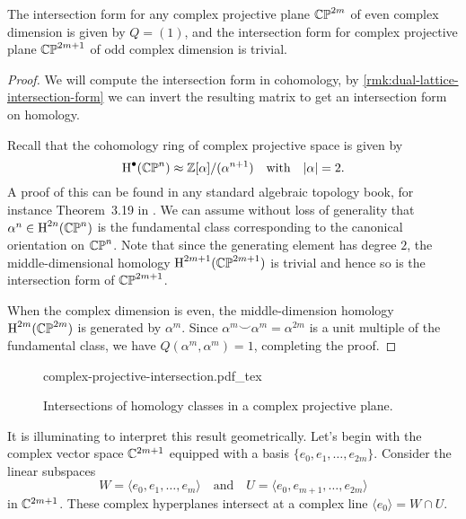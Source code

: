 \begin{proposition}\label{prop:intersection-form-complex-projective-plane}
	The intersection form for any complex projective plane $\mathbb{CP}^{2m}$ of even complex dimension is given by $Q=(1)$, and the intersection form for complex projective plane $\mathbb{CP}^{2m+1}$ of odd complex dimension is trivial.
\end{proposition}
\begin{proof}
	We will compute the intersection form in cohomology, by \cref{rmk:dual-lattice-intersection-form} we can invert the resulting matrix to get an intersection form on homology.

	Recall that the cohomology ring of complex projective space is given by
	\begin{equation}
		\operatorname{H}^\bullet(\mathbb{CP}^{n}) \approx \mathbb{Z}[\alpha]/(\alpha^{n+1})\quad\textrm{with}\quad |\alpha|=2.
	\end{equation}
	A proof of this can be found in any standard algebraic topology book, for instance Theorem~3.19 in \cite{hatcher2002topology}. We can assume without loss of generality that $\alpha^n\in \operatorname{H}^{2n}(\mathbb{CP}^n)$ is the fundamental class corresponding to the canonical orientation on $\mathbb{CP}^n$.
	Note that since the generating element has degree $2$, the middle-dimensional homology $\operatorname{H}^{2m+1}(\mathbb{CP}^{2m+1})$ is trivial and hence so is the intersection form of $\mathbb{CP}^{2m+1}$.

	When the complex dimension is even, the middle-dimension homology $\operatorname{H}^{2m}(\mathbb{CP}^{2m})$ is generated by $\alpha^m$. Since $\alpha^m\smile \alpha^m=\alpha^{2m}$ is a unit multiple of the fundamental class, we have $Q(\alpha^m, \alpha^m)=1$, completing the proof.
\end{proof}

\begin{figure}[ht]
	\centering
	{complex-projective-intersection.pdf_tex}
	\caption{Intersections of homology classes in a complex projective plane.}\label{fig:geometric-intersection-complex-projective}
\end{figure}

It is illuminating to interpret this result geometrically. Let's begin with the complex vector space $\mathbb{C}^{2m+1}$ equipped with a basis $\{e_0, e_1,\ldots, e_{2m}\}$. Consider the linear subspaces
\begin{equation}
	W = \langle e_0, e_1,\ldots, e_m\rangle \quad\textrm{and}\quad U = \langle e_0, e_{m+1},\ldots, e_{2m}\rangle
\end{equation}
in $\mathbb{C}^{2m+1}$. These complex hyperplanes intersect at a complex line $\langle e_0 \rangle = W\cap U$.

